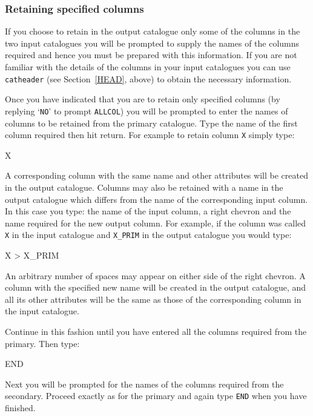\documentclass[twoside,11pt]{starlink}
\begin{document}
\subsubsection{\label{PAIR_INP_COL}Retaining specified columns}

If you choose to retain in the output catalogue only some of the columns
in the two input catalogues you will be prompted to supply the names of
the columns required and hence you must be prepared with this information.
If you are not familiar with the details of the columns in your input
catalogues you can use \texttt{catheader} (see Section~\ref{HEAD}, above) to
obtain the necessary information.

Once you have indicated that you are to retain only specified columns (by
replying `\texttt{NO}' to prompt \texttt{ALLCOL}) you will be prompted to enter
the names of columns to be retained from the primary catalogue. Type the
name of the first column required then hit return. For example to retain
column \texttt{X} simply type:

\begin{terminalv}
X
\end{terminalv}

A corresponding column with the same name and other attributes will be
created in the output catalogue. Columns may also be retained with a name
in the output catalogue which differs from the name of the corresponding
input column. In this case you type: the name of the input column, a right
chevron and the name required for the new output column. For example, if
the column was called \texttt{X} in the input catalogue and \texttt{X\_PRIM}
in the output catalogue you would type:

\begin{terminalv}
X > X_PRIM
\end{terminalv}

An arbitrary number of spaces may appear on either side of the right
chevron. A column with the specified new name will be created in the
output catalogue, and all its other attributes will be the same as those
of the corresponding column in the input catalogue.

Continue in this fashion until you have entered all the columns required
from the primary.  Then type:

\begin{terminalv}
END
\end{terminalv}

Next you will be prompted for the names of the columns required from the
secondary. Proceed exactly as for the primary and again type \texttt{END}
when you have finished.
\end{document}
